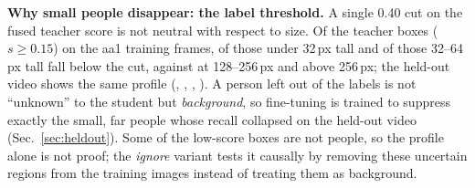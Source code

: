 \ifHaveLabelThr
\textbf{Why small people disappear: the label threshold.} A single 0.40 cut on the fused teacher score is not neutral
with respect to size. Of the teacher boxes ($s\ge0.15$) on the aa1 training frames, \LtAaA{} of those under 32\,px
tall and \LtAaB{} of those 32--64\,px tall fall below the cut, against \LtAaD{} at 128--256\,px and \LtAaE{} above
256\,px; the held-out video shows the same profile (\LtHoA, \LtHoB, \LtHoD, \LtHoE). A person left out of the labels
is not ``unknown'' to the student but \emph{background}, so fine-tuning is trained to suppress exactly the small, far
people whose recall collapsed on the held-out video (Sec.~\ref{sec:heldout}). Some of the low-score boxes are not
people, so the profile alone is not proof; the \emph{ignore} variant tests it causally by removing these
\LtGreyed{} uncertain regions from the training images instead of treating them as background.
\fi
